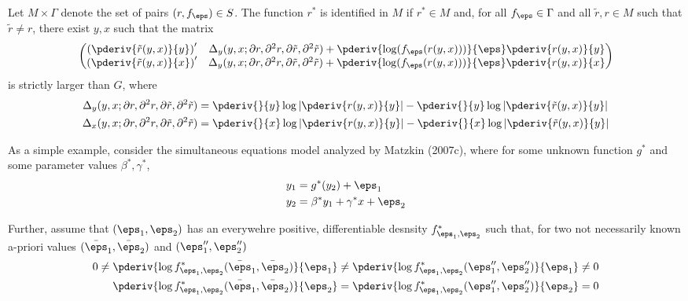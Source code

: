 \begin{theorem}[Matzkin, 2005]
  Let $M \times \Gamma$ denote the set of pairs $(r,f_\eps)\in S$. The function $r^*$ is identified in $M$ if  $r^* \in M$ and, for all $f_\eps \in \Gamma$ and all $\tilde{r},r \in M$ such that $\tilde{r}\neq r$, there exist $y,x$ such that the matrix 
  \[\begin{pmatrix}
      \left(\pderiv{\tilde{r}(y,x)}{y}\right)'& \Delta_y(y,x; \partial r, \partial^2 r, \partial \tilde{r}, \partial^2\tilde{r}) + \pderiv{\log(f_\eps(r(y,x)))}{\eps} \pderiv{r(y,x)}{y} \\
      \left(\pderiv{\tilde{r}(y,x)}{x}\right)'& \Delta_y(y,x; \partial r, \partial^2 r, \partial \tilde{r}, \partial^2\tilde{r}) + \pderiv{\log(f_\eps(r(y,x)))}{\eps} \pderiv{r(y,x)}{x} 
  \end{pmatrix}\]  
  is strictly larger than $G$, where 
  \begin{align*}
    \Delta_y(y,x; \partial r, \partial^2 r, \partial \tilde{r}, \partial^2\tilde{r}) &= \pderiv{}{y}\log\left|\pderiv{r(y,x)}{y}\right| - \pderiv{}{y}\log\left|\pderiv{\tilde{r}(y,x)}{y}\right| \\
    \Delta_x(y,x; \partial r, \partial^2 r, \partial \tilde{r}, \partial^2\tilde{r}) &= \pderiv{}{x}\log\left|\pderiv{r(y,x)}{y}\right| - \pderiv{}{x}\log\left|\pderiv{\tilde{r}(y,x)}{y}\right|
  \end{align*}
\end{theorem}
\begin{example}
  As a simple example, consider the simultaneous equations model analyzed by Matzkin (2007c), where for some unknown function $g^*$ and some parameter values $\beta^*, \gamma^*$,
  \begin{align*}
    y_1 &= g^*(y_2) + \eps_1\\
    y_2 &= \beta^*y_1 + \gamma^*x + \eps_2
  \end{align*}
\end{example}
Further, assume that $(\eps_1, \eps_2)$ has an everywehre positive, differentiable desnsity $f^*_{\eps_1,\eps_2}$ such that, for two not necessarily known a-priori values $(\bar{\eps}_1, \bar{\eps}_2)$ and $(\eps_1'', \eps_2'')$ 
\begin{align*}
    0 \neq \pderiv{\log f^*_{\eps_1,\eps_2}(\bar{\eps}_1,\bar{\eps}_2)}{\eps_1} &\neq \pderiv{\log f^*_{\eps_1,\eps_2}(\eps_1'', \eps_2'')}{\eps_1} \neq 0 \\ 
    \pderiv{\log f^*_{\eps_1,\eps_2}(\bar{\eps}_1, \bar{\eps}_2)}{\eps_2} &= \pderiv{\log f^*_{\eps_1,\eps_2}(\eps_1'', \eps_2'')}{\eps_2} = 0
\end{align*}
